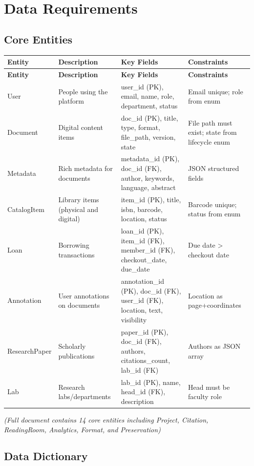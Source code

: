 \documentclass[12pt,a4paper]{report}
\begin{document}
\chapter{Data Requirements}

\section{Core Entities}

\begin{longtable}{|p{2.5cm}|p{4cm}|p{4cm}|p{3cm}|}
\hline
\textbf{Entity} & \textbf{Description} & \textbf{Key Fields} & \textbf{Constraints} \\ \hline
\endfirsthead
\hline
\textbf{Entity} & \textbf{Description} & \textbf{Key Fields} & \textbf{Constraints} \\ \hline
\endhead
User & People using the platform & user\_id (PK), email, name, role, department, status & Email unique; role from enum \\ \hline
Document & Digital content items & doc\_id (PK), title, type, format, file\_path, version, state & File path must exist; state from lifecycle enum \\ \hline
Metadata & Rich metadata for documents & metadata\_id (PK), doc\_id (FK), author, keywords, language, abstract & JSON structured fields \\ \hline
CatalogItem & Library items (physical and digital) & item\_id (PK), title, isbn, barcode, location, status & Barcode unique; status from enum \\ \hline
Loan & Borrowing transactions & loan\_id (PK), item\_id (FK), member\_id (FK), checkout\_date, due\_date & Due date > checkout date \\ \hline
Annotation & User annotations on documents & annotation\_id (PK), doc\_id (FK), user\_id (FK), location, text, visibility & Location as page+coordinates \\ \hline
ResearchPaper & Scholarly publications & paper\_id (PK), doc\_id (FK), authors, citations\_count, lab\_id (FK) & Authors as JSON array \\ \hline
Lab & Research labs/departments & lab\_id (PK), name, head\_id (FK), description & Head must be faculty role \\ \hline
\end{longtable}

\textit{(Full document contains 14 core entities including Project, Citation, ReadingRoom, Analytics, Format, and Preservation)}

\section{Data Dictionary}
\end{document}

